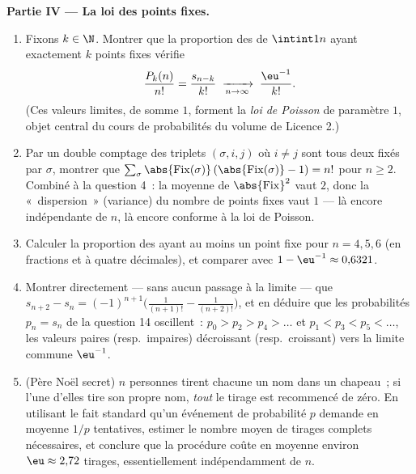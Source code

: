 \begin{problem}
\medskip
\noindent\textbf{Partie IV --- La loi des points fixes.}
\begin{enumerate}[resume]
  \item Fixons $k \in \N$. Montrer que la proportion des 
        de $\intint1n$ ayant exactement $k$ points fixes vérifie
        \[
        \frac{P_k(n)}{n!} = \frac{s_{n-k}}{k!}
        \;\xrightarrow[n \to \infty]{}\; \frac{\eu^{-1}}{k!} .
        \]
        (Ces valeurs limites, de somme $1$, forment la \emph{loi de
        Poisson} de paramètre $1$, objet central du cours de
        probabilités du volume de Licence 2.)
  \item Par un double comptage des triplets $(\sigma, i, j)$ où $i
        \neq j$ sont tous deux fixés par $\sigma$, montrer que
        $\sum_\sigma \abs{\mathrm{Fix}(\sigma)}\,
        (\abs{\mathrm{Fix}(\sigma)} - 1) = n!$ pour $n \geq 2$.
        Combiné à la question 4~: la moyenne de
        $\abs{\mathrm{Fix}}^2$ vaut $2$, donc la «~dispersion~»
        (variance) du nombre de points fixes vaut $1$ --- là encore
        indépendante de $n$, là encore conforme à la loi de Poisson.
  \item Calculer la proportion des  ayant au moins un
        point fixe pour $n = 4, 5, 6$ (en fractions et à quatre
        décimales), et comparer avec $1 - \eu^{-1} \approx
        0{,}6321$.
  \item Montrer directement --- sans aucun passage à la limite --- que
        $s_{n+2} - s_n = (-1)^{n+1}\bigl(\frac1{(n+1)!} - \frac1{(n+2)!}\bigr)$,
        et en déduire que les probabilités $p_n = s_n$ de la
        question 14 oscillent~: $p_0 > p_2 > p_4 > \dots$ et
        $p_1 < p_3 < p_5 < \dots$, les valeurs paires (resp.\ impaires)
        décroissant (resp.\ croissant) vers la limite commune
        $\eu^{-1}$.
  \item (Père Noël secret) $n$ personnes tirent chacune un nom dans un
        chapeau~; si l'une d'elles tire son propre nom, \emph{tout} le
        tirage est recommencé de zéro. En utilisant le fait standard
        qu'un événement de probabilité $p$ demande en moyenne $1/p$
        tentatives, estimer le nombre moyen de tirages complets
        nécessaires, et conclure que la procédure coûte en moyenne
        environ $\eu \approx 2{,}72$ tirages, essentiellement
        indépendamment de $n$.
\end{enumerate}


\end{problem}

